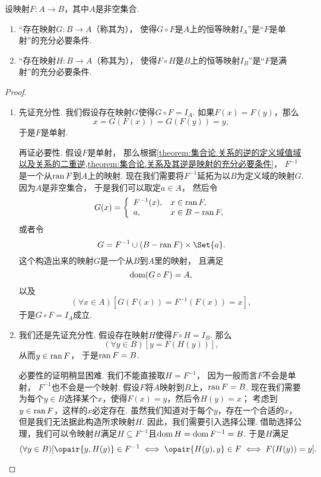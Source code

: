 \begin{theorem}
设映射\(F\colon A \to B\)，其中\(A\)是非空集合.
\begin{enumerate}
	\item “存在映射\(G\colon B \to A\)（称其为），
	使得\(G \circ F\)是\(A\)上的恒等映射\(I_A\)”是“\(F\)是单射”的充分必要条件.

	\item “存在映射\(H\colon B \to A\)（称其为），
	使得\(F \circ H\)是\(B\)上的恒等映射\(I_B\)”是“\(F\)是满射”的充分必要条件.
\end{enumerate}
\begin{proof}
\begin{enumerate}
	\item
	先证充分性.
	我们假设存在映射\(G\)使得\(G \circ F = I_A\).
	如果\(F(x) = F(y)\)，那么\[
		x = G(F(x)) = G(F(y)) = y,
	\]
	于是\(F\)是单射.

	再证必要性.
	假设\(F\)是单射，
	那么根据\cref{theorem:集合论.关系的逆的定义域值域以及关系的二重逆,theorem:集合论.关系及其逆是映射的充分必要条件}，
	\(F^{-1}\)是一个从\(\operatorname{ran} F\)到\(A\)上的映射.
	现在我们需要将\(F^{-1}\)延拓为以\(B\)为定义域的映射\(G\).
	因为\(A\)是非空集合，
	于是我们可以取定\(a \in A\)，
	然后令\[
		G(x) = \left\{ \begin{array}{ll}
			F^{-1}(x), & x \in \operatorname{ran} F, \\
			a, & x \in B - \operatorname{ran} F,
		\end{array} \right.
	\]或者令\[
		G = F^{-1} \cup (B - \ran F) \times \Set{a}.
	\]
	这个构造出来的映射\(G\)是一个从\(B\)到\(A\)里的映射，
	且满足\[
		\operatorname{dom}(G \circ F) = A,
	\]
	以及\[
		(\forall x \in A)[G(F(x)) = F^{-1}(F(x)) = x],
	\]
	于是\(G \circ F = I_A\)成立.

	\item
	我们还是先证充分性.
	假设存在映射\(H\)使得\(F \circ H = I_B\).
	那么\[
		(\forall y \in B)[y = F(H(y))],
	\]
	从而\(y \in \operatorname{ran} F\)，
	于是\(\operatorname{ran} F = B\).

	必要性的证明稍显困难.
	我们不能直接取\(H = F^{-1}\)，
	因为一般而言\(F\)不会是单射，
	\(F^{-1}\)也不会是一个映射.
	假设\(F\)将\(A\)映射到\(B\)上，\(\operatorname{ran} F = B\).
	现在我们需要为每个\(y \in B\)选择某个\(x\)，使得\(F(x) = y\)，然后令\(H(y) = x\)；
	考虑到\(y \in \operatorname{ran} F\)，这样的\(x\)必定存在.
	虽然我们知道对于每个\(y\)，存在一个合适的\(x\)，
	但是我们无法据此构造所求映射\(H\).
	因此，我们需要引入选择公理.
	借助选择公理，我们可以令映射\(H\)满足\(H \subseteq F^{-1}\)且\(\operatorname{dom} H = \operatorname{dom} F^{-1} = B\).
	于是\(H\)满足\[
		(\forall y \in B)
		[
			\opair{y,H(y)} \in F^{-1}
			\iff
			\opair{H(y),y} \in F
			\iff
			F(H(y)) = y
		].
		\qedhere
	\]
\end{enumerate}
\end{proof}
\end{theorem}

